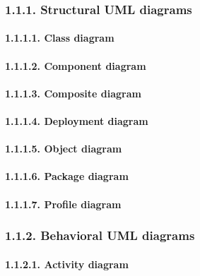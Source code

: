 \documentclass[]{article}
\let\oldparagraph\paragraph
\renewcommand{\paragraph}[1]{\oldparagraph{#1}\mbox{}}
\begin{document}
\subsubsection{1.1.1. Structural UML
diagrams}\label{structural-uml-diagrams}

\paragraph{1.1.1.1. Class diagram}\label{class-diagram}

\paragraph{1.1.1.2. Component diagram}\label{component-diagram}

\paragraph{1.1.1.3. Composite diagram}\label{composite-diagram}

\paragraph{1.1.1.4. Deployment diagram}\label{deployment-diagram}

\paragraph{1.1.1.5. Object diagram}\label{object-diagram}

\paragraph{1.1.1.6. Package diagram}\label{package-diagram}

\paragraph{1.1.1.7. Profile diagram}\label{profile-diagram}

\subsubsection{1.1.2. Behavioral UML
diagrams}\label{behavioral-uml-diagrams}

\paragraph{1.1.2.1. Activity diagram}\label{activity-diagram}
\end{document}
